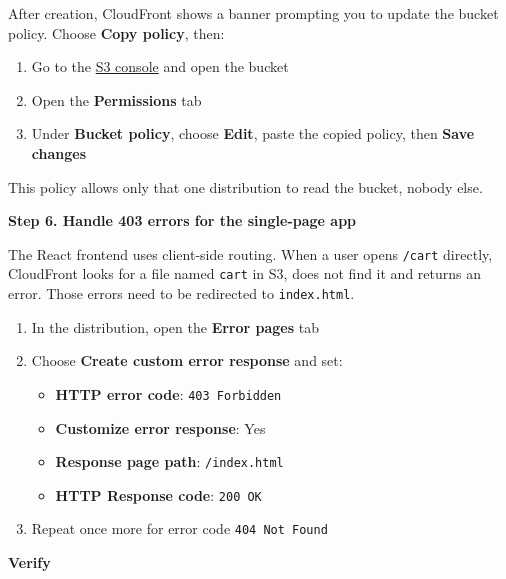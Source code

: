 After creation, CloudFront shows a banner prompting you to update the
bucket policy. Choose \textbf{Copy policy}, then:

\begin{enumerate}
\def\labelenumi{\arabic{enumi}.}
\tightlist
\item
  Go to the
  \href{https://s3.console.aws.amazon.com/s3/home?region=ap-southeast-1}{S3
  console} and open the bucket
\item
  Open the \textbf{Permissions} tab
\item
  Under \textbf{Bucket policy}, choose \textbf{Edit}, paste the copied
  policy, then \textbf{Save changes}
\end{enumerate}

This policy allows only that one distribution to read the bucket, nobody
else.

\vspace{0.5em}\noindent\textbf{Step 6. Handle 403 errors for the single-page
app}\par

The React frontend uses client-side routing. When a user opens
\texttt{/cart} directly, CloudFront looks for a file named \texttt{cart}
in S3, does not find it and returns an error. Those errors need to be
redirected to \texttt{index.html}.

\begin{enumerate}
\def\labelenumi{\arabic{enumi}.}
\tightlist
\item
  In the distribution, open the \textbf{Error pages} tab
\item
  Choose \textbf{Create custom error response} and set:

  \begin{itemize}
  \tightlist
  \item
    \textbf{HTTP error code}: \texttt{403\ Forbidden}
  \item
    \textbf{Customize error response}: Yes
  \item
    \textbf{Response page path}: \texttt{/index.html}
  \item
    \textbf{HTTP Response code}: \texttt{200\ OK}
  \end{itemize}
\item
  Repeat once more for error code \texttt{404\ Not\ Found}
\end{enumerate}

\vspace{0.5em}\noindent\textbf{Verify}\par


